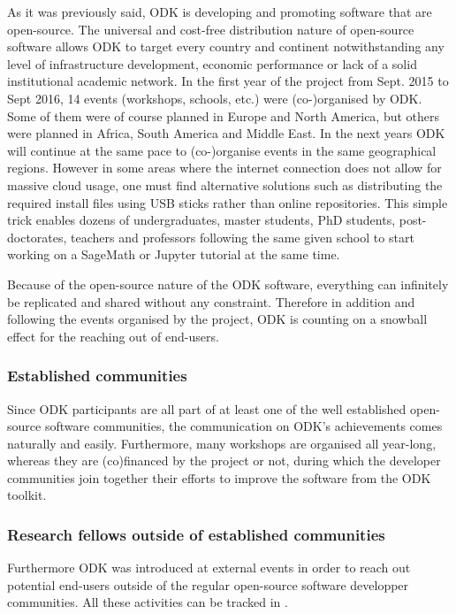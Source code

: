 \documentclass{deliverablereport}
\begin{document}
As it was previously said, ODK is developing and promoting software that are open-source. The universal and cost-free distribution nature of open-source software allows ODK to target every country and continent notwithstanding any level of infrastructure development, economic performance or lack of a solid institutional academic network.
In the first year of the project from Sept. 2015 to Sept 2016, 14 events (workshops, schools, etc.) were (co-)organised by ODK. Some of them were of course planned in Europe and North America, but others were planned in Africa, South America and Middle East. In the next years ODK will continue at the same pace to (co-)organise events in the same geographical regions.
However in some areas where the internet connection does not allow for massive cloud usage, one must find alternative solutions such as distributing the required install files using USB sticks  rather than online repositories. This simple trick enables dozens of undergraduates, master students, PhD students, post-doctorates, teachers and professors following the same given school to start working on a SageMath or Jupyter tutorial at the same time.

Because of the open-source nature of the ODK software, everything can infinitely be replicated and shared without any constraint. Therefore in addition and following the events organised by the project, ODK is counting on a snowball effect for the reaching out of end-users.

\subsubsection{Established communities}

Since ODK participants are all part of at least one of the well established open-source software communities, the communication on ODK's achievements comes naturally and easily. Furthermore, many workshops are organised all year-long, whereas they are (co)financed by the project or not, during which the developer communities join together their efforts to improve the software from the ODK toolkit.

\subsubsection{Research fellows outside of established communities}

Furthermore ODK was introduced at external events in order to reach out potential end-users outside of the regular open-source software developper communities.
All these activities can be tracked in .
\end{document}
